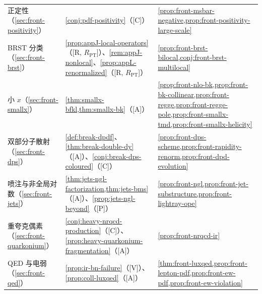 \begin{table}[htbp]
\begin{tabularx}{\textwidth}{@{}p{2.4cm}>{\raggedright\arraybackslash}X>{\raggedright\arraybackslash}X@{}}
正定性（\cref{sec:front-positivity}） & \cref{conj:pdf-positivity}（[C]） & \cref{prop:front-msbar-negative,prop:front-positivity-large-scale} \\
BRST 分类（\cref{sec:front-brst}） & \cref{prop:appJ-local-operators}（[R, $R_{\mathrm{PT}}$]）、\cref{rem:appJ-nonlocal}、\cref{prop:appL-renormalized}（[R, $R_{\mathrm{PT}}$]） & \cref{prop:front-brst-bilocal,conj:front-brst-multilocal} \\
小 $x$（\cref{sec:front-smallx}） & \cref{thm:smallx-bfkl,thm:smallx-bk}（[A]） & \cref{prop:front-nlo-bk,prop:front-bk-collinear,prop:front-regge,prop:front-regge-pole,prop:front-smallx-tmd,prop:front-smallx-helicity} \\
双部分子散射（\cref{sec:front-dps}） & \cref{def:break-dpdf}、\cref{thm:break-double-dy}（[A]）、\cref{conj:break-dps-coloured}（[C]） & \cref{prop:front-dps-scheme,prop:front-rapidity-renorm,prop:front-dpd-evolution} \\
喷注与非全局对数（\cref{sec:front-jets}） & \cref{thm:jets-ngl-factorization,thm:jets-bms}（[A]）、\cref{prop:jets-ngl-beyond}（[P]） & \cref{prop:front-ngl,prop:front-jet-substructure,prop:front-lightray-ope} \\
重夸克偶素（\cref{sec:front-quarkonium}） & \cref{conj:heavy-nrqcd-production}（[C]）、\cref{prop:heavy-quarkonium-fragmentation}（[A]） & \cref{prop:front-nrqcd-ir} \\
QED 与电弱（\cref{sec:front-qed}） & \cref{prop:ir-bn-failure}（[V]）、\cref{prop:coll-luxqed}（[A]） & \cref{thm:front-luxqed,prop:front-lepton-pdf,prop:front-ew-pdf,prop:front-ew-violation} \\
\bottomrule
\end{tabularx}
\end{table}
